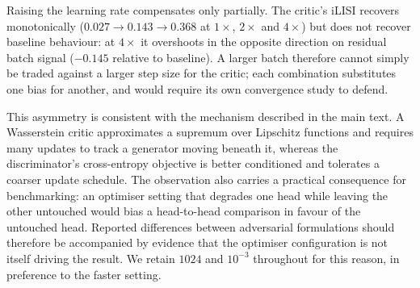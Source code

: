 \documentclass[11pt, a4paper]{article}
\begin{document}
Raising the learning rate compensates only partially. The critic's iLISI recovers
monotonically ($0.027 \rightarrow 0.143 \rightarrow 0.368$ at $1\times$, $2\times$ and
$4\times$) but does not recover baseline behaviour: at $4\times$ it overshoots in the
opposite direction on residual batch signal ($-0.145$ relative to baseline). A larger
batch therefore cannot simply be traded against a larger step size for the critic; each
combination substitutes one bias for another, and would require its own convergence
study to defend.

This asymmetry is consistent with the mechanism described in the main text. A Wasserstein
critic approximates a supremum over Lipschitz functions and requires many updates to track
a generator moving beneath it, whereas the discriminator's cross-entropy objective is
better conditioned and tolerates a coarser update schedule. The observation also carries a
practical consequence for benchmarking: an optimiser setting that degrades one head while
leaving the other untouched would bias a head-to-head comparison in favour of the
untouched head. Reported differences between adversarial formulations should therefore be
accompanied by evidence that the optimiser configuration is not itself driving the result.
We retain $1024$ and $10^{-3}$ throughout for this reason, in preference to the faster
setting.
\end{document}
